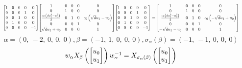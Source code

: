 \documentclass[11pt]{article}
\theoremstyle{definition}
\begin{document}
\[
\scaletoalign{\textwidth}{{\left[\begin{matrix}1 & 0 & 0 & 0 & 0\\0 & 0 & 0 & 1 & 0\\0 & 0 & 1 & 0 & 0\\0 & 1 & 0 & 0 & 0\\0 & 0 & 0 & 0 & -1\end{matrix}\right]} {\left[\begin{matrix}1 & 0 & 0 & 0 & 0\\0 & 1 & 0 & 0 & 0\\\frac{c_{0} \left(d u_{1}^{2} - u_{0}^{2}\right)}{2} & 0 & 1 & 0 & c_{0} \left(\sqrt{d} u_{1} - u_{0}\right)\\0 & 0 & 0 & 1 & 0\\\sqrt{d} u_{1} + u_{0} & 0 & 0 & 0 & 1\end{matrix}\right]} {\left[\begin{matrix}1 & 0 & 0 & 0 & 0\\0 & 0 & 0 & 1 & 0\\0 & 0 & 1 & 0 & 0\\0 & 1 & 0 & 0 & 0\\0 & 0 & 0 & 0 & -1\end{matrix}\right]} = {\left[\begin{matrix}1 & 0 & 0 & 0 & 0\\0 & 1 & 0 & 0 & 0\\\frac{c_{0} \left(d u_{1}^{2} - u_{0}^{2}\right)}{2} & 0 & 1 & 0 & c_{0} \left(- \sqrt{d} u_{1} + u_{0}\right)\\0 & 0 & 0 & 1 & 0\\- \sqrt{d} u_{1} - u_{0} & 0 & 0 & 0 & 1\end{matrix}\right]}}
\]
\[
\alpha = \left( 0, \  -2, \  0, \  0, \  0\right), \beta = \left( -1, \  1, \  0, \  0, \  0\right), \sigma_{\alpha}(\beta) = \left( -1, \  -1, \  0, \  0, \  0\right)
\]
\[
\scaletoalign{\textwidth}{w_{\alpha} X_{\beta}\left(\left[\begin{matrix}u_{0}\\u_{1}\end{matrix}\right]\right) w_{\alpha}^{-1} = X_{\sigma_{\alpha}\left(\beta\right)}\left(\left[\begin{matrix}u_{0}\\u_{1}\end{matrix}\right]\right)}
\]
\end{document}
